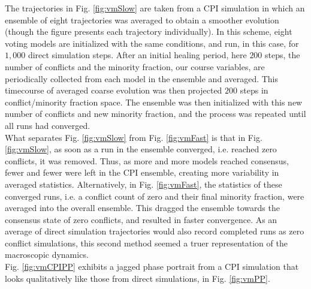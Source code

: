 \documentclass[11pt]{article}
\begin{document}
The trajectories in Fig. \ref{fig:vmSlow} are taken from a CPI simulation in which an ensemble of eight trajectories was averaged to obtain a smoother evolution (though the figure presents each trajectory individually). In this scheme, eight voting models are initialized with the same conditions, and run, in this case, for $1,000$ direct simulation steps. After an initial healing period, here $200$ steps, the number of conflicts and the minority fraction, our course variables, are periodically collected from each model in the ensemble and averaged. This timecourse of averaged coarse evolution was then projected $200$ steps in conflict/minority fraction space. The ensemble was then initialized with this new number of conflicts and new minority fraction, and the process was repeated until all runs had converged. \\
\indent What separates Fig. \ref{fig:vmSlow} from Fig. \ref{fig:vmFast} is that in Fig. \ref{fig:vmSlow}, as soon as a run in the ensemble converged, i.e. reached zero conflicts, it was removed. Thus, as more and more models reached consensus, fewer and fewer were left in the CPI ensemble, creating more variability in averaged statistics. Alternatively, in Fig. \ref{fig:vmFast}, the statistics of these converged runs, i.e. a conflict count of zero and their final minority fraction, were averaged into the overall ensemble. This dragged the ensemble towards the consensus state of zero conflicts, and resulted in faster convergence. As an average of direct simulation trajectories would also record completed runs as zero conflict simulations, this second method seemed a truer representation of the macroscopic dynamics.\\
\indent Fig. \ref{fig:vmCPIPP} exhibits a jagged phase portrait from a CPI simulation that looks qualitatively like those from direct simulations, in Fig. \ref{fig:vmPP}.
\end{document}
